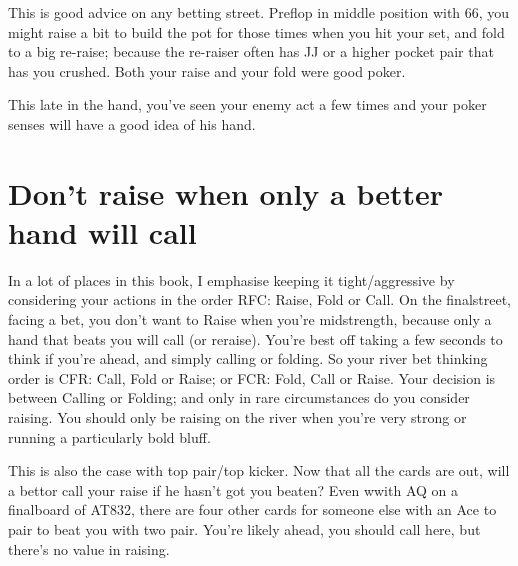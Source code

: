This is good advice on any betting street. Preflop in middle
position with 66, you might raise a bit to build the pot for those
times when you hit your set, and fold to a big re-raise; because the
re-raiser often has JJ or a higher pocket pair that has you crushed.
Both your raise and your fold were good poker.



This late in the hand, you've seen your enemy act a few times and your
poker senses will have a good idea of his hand.

\section{Don't raise when only a better hand will call}

In a lot of places in this book, I emphasise keeping it
tight/aggressive by considering your actions in the order RFC: Raise,
Fold or Call. On the finalstreet, facing a bet, you don't want to
Raise when you're midstrength, because only a hand that beats you will
call (or reraise). You're best off taking a few seconds to think if
you're ahead, and simply calling or folding. So your river bet
thinking order is CFR: Call, Fold or Raise; or FCR: Fold, Call or
Raise. Your decision is between Calling or Folding; and only in rare
circumstances do you consider raising. You should only be raising
on the river when you're very strong or running a particularly bold
bluff.

This is also the case with top pair/top kicker. Now that all the cards
are out, will a bettor call your raise if he hasn't got you beaten?
Even wwith AQ on a finalboard of AT832, there are four other cards for
someone else with an Ace to pair to beat you with two pair. You're
likely ahead, you should call here, but there's no value in raising.
